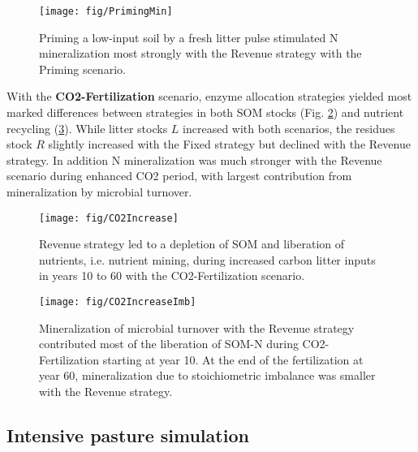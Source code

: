 \begin{figure}[t]
\vspace*{2mm}
\begin{center}
\texttt{[image: fig/PrimingMin]}
\end{center}
\caption{Priming a low-input soil by a fresh litter pulse stimulated N
mineralization most strongly with the Revenue strategy with the Priming scenario.
\label{fig:PrimingMin}}
\end{figure}

With the \textbf{CO2-Fertilization} scenario, enzyme allocation strategies
yielded most marked differences between strategies in both SOM stocks (Fig.
\ref{fig:CO2Increase}) and nutrient recycling (\ref{fig:CO2IncreaseImb}). While
litter stocks $L$ increased with both scenarios, the residues stock $R$
slightly increased with the Fixed strategy but declined with the Revenue strategy. In
addition N mineralization was much stronger with the Revenue scenario during
enhanced CO2 period, with largest contribution from mineralization by microbial
turnover.

\begin{figure}[t] \vspace*{2mm}
\begin{center}
\texttt{[image: fig/CO2Increase]}
\end{center}
\caption{
Revenue strategy led to a depletion of SOM and liberation of nutrients, i.e.
nutrient mining, during increased carbon litter inputs
in years 10 to 60 with the CO2-Fertilization scenario.
\label{fig:CO2Increase}}

\end{figure}
\begin{figure}[t] \vspace*{2mm}
\begin{center}
\texttt{[image: fig/CO2IncreaseImb]} 
\end{center}
\caption{
Mineralization of microbial turnover with the Revenue strategy
contributed most of the liberation of SOM-N during CO2-Fertilization starting
at year 10.
At the end of the fertilization at year 60, mineralization due to stoichiometric
imbalance was smaller with the Revenue strategy.
\label{fig:CO2IncreaseImb}}
\end{figure}

\subsection{Intensive pasture simulation}
\label{sec:ResultsPasture}

